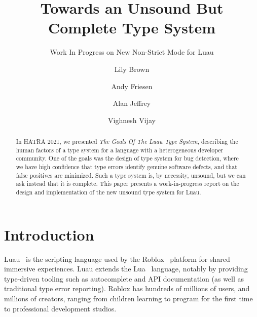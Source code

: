 \documentclass[sigplan]{acmart}
\begin{document}
\title{Towards an Unsound But Complete Type System}
\subtitle{Work In Progress on New Non-Strict Mode for Luau}

\author{Lily Brown}
\author{Andy Friesen}
\author{Alan Jeffrey}
\author{Vighnesh Vijay}

\begin{abstract}
In HATRA 2021, we presented \emph{The Goals Of The Luau Type System},
describing the human factors of a type system for a language with a
heterogeneous developer community.  One of the goals was the design of
type system for bug detection, where we have high confidence that type
errors identify genuine software defects, and that false positives are
minimized. Such a type system is, by necessity, unsound, but we can ask
instead that it is complete. This paper presents a work-in-progress report
on the design and implementation of the new unsound type system for Luau.
\end{abstract}

\maketitle

\section{Introduction}

Luau~\cite{Luau} is the scripting language used by the
Roblox~\cite{Roblox} platform for shared immersive experiences.  Luau extends
the Lua~\cite{Lua} language, notably by providing type-driven tooling
such as autocomplete and API documentation (as well as traditional type
error reporting). Roblox has hundreds of millions of users, and
millions of creators, ranging from children learning to program for
the first time to professional development studios.
\end{document}
